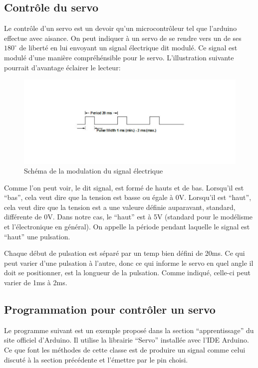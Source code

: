 \documentclass[a4paper,12pt]{article}
\begin{document}
{\subsection{Contrôle du servo}
Le contr\^ole d'un servo est un devoir qu'un microcontr\^oleur tel que
l'arduino effectue avec aisance. On peut indiquer \`a un servo de se rendre vers
un de ses $180^{\circ}$ de libert\'e en lui envoyant un signal \'electrique dit
modul\'e. Ce signal est modul\'e d'une mani\`ere compréh\'ensible pour le
servo. L'illustration suivante
pourrait d'avantage \'eclairer le lecteur:

\begin{figure}[h]
\centering
\includegraphics[width=1.0\textwidth]{figures/ServoPwm}
    \caption{\label{ServoPwm}Sch\'ema de la modulation du signal
      \'electrique \protect
      \cite{WikiServo}
    }
\end{figure}

Comme l'on peut voir, le dit signal, est form\'e de hauts et de
bas. Lorsqu'il est ``bas'', cela veut dire que la tension est basse ou \'egale
\`a 0V. Lorsqu'il est
``haut'', cela veut dire que la tension est a une valeure d\'efinie auparavant,
standard, diff\'erente de 0V. Dans notre cas, le ``haut'' est \`a 5V (standard
pour le mod\'elisme et l'\'electronique en g\'en\'eral). On appelle la
p\'eriode pendant laquelle le signal est ``haut'' une pulsation.

Chaque d\'ebut de pulsation est s\'epar\'e par un temp bien d\'efini de
20ms. Ce qui peut varier d'une pulsation \`a l'autre, donc ce qui informe le
servo en quel angle il doit se positionner, est la longueur de la
pulsation. Comme indiqu\'e, celle-ci peut varier de 1ms \`a 2ms.

\subsection{Programmation pour contr\^oler un servo}
Le programme suivant est un exemple propos\'e dans la section
``apprentissage'' du site officiel d'Arduino. Il utilise la librairie
``Servo'' install\'ee avec l'IDE Arduino. Ce que font les m\'ethodes de cette
classe est de produire un signal comme celui discut\'e \`a la section
pr\'ec\'edente et l'\'emettre par le pin choisi.

}
\end{document}

